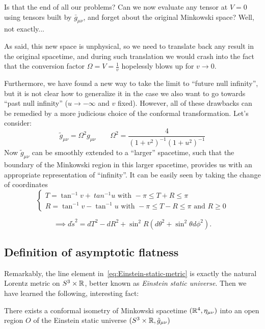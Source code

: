 Is that the end of all our problems? Can we now evaluate any tensor at \(V = 0\) using tensors built by \(\bar{g}_{\mu\nu}\), and forget about the original Minkowski space?
Well, not exactly...

\noindent As said, this new space is unphysical, so we need to translate back any result in the original spacetime, and during such translation we would crash into the fact that the conversion factor \(\Omega = V= \frac{1}{v}\) hopelessly blows up for \(v \rightarrow 0\).

Furthermore, we have found a new way to take the limit to ``future null infinity'', but it is not clear how to generalize it in the case we also want to go towards ``past null infinity'' (\(u \rightarrow -\infty\) and \(v\) fixed). However, all of these drawbacks can be remedied by a more judicious choice of the conformal transformation. Let's consider:
\[
\tilde{g}_{\mu\nu} = \Omega^2 g_{\mu\nu} \quad\quad \Omega^2 = \frac{4}{(1 + v^2)^{-1}(1 + u^2)^{-1}} 
\]
Now \(\tilde{g}_{\mu\nu}\) can be smoothly extended to a ``larger'' spacetime, such that the boundary of the Minkowski region in this larger spacetime, provides us with an appropriate representation of ``infinity''.
It can be easily seen by taking the change of coordinates
\[
\begin{cases}
T = \tan^{-1}v +\ tan^{-1}u \text{ with } -\pi \le T + R \le \pi\\
R = \tan^{-1}v - \tan^{-1}u \text{ with } -\pi \le T - R \le \pi \text{ and } R \ge 0
\end{cases}
\]

\begin{equation}
\label{eq:Einstein-static-metric}
	\implies
	d\tilde{s}^2 = dT^2 - dR^2 + \sin^2R(d\theta^2 + \sin^2\theta d\phi^2).
\end{equation}

\subsection{Definition of asymptotic flatness}
Remarkably, the line element in~\eqref{eq:Einstein-static-metric} is exactly the natural Lorentz metric on \(S^3 \times {\mathbb{R}}\), better known as \emph{Einstein static universe}. Then we have learned the following, interesting fact:
\begin{prop}
	There exists a conformal isometry of Minkowski spacetime \(({\mathbb{R}}^4, \eta_{\mu\nu})\) into an open region \(O\) of the Einstein static universe \((S^3 \times {\mathbb{R}}, \tilde{g}_{\mu\nu})\)
\end{prop}

